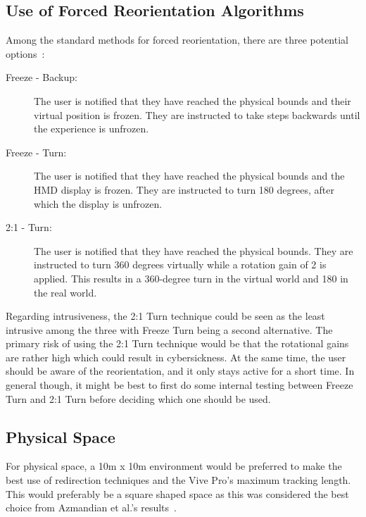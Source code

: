 \subsection{Use of Forced Reorientation Algorithms}
Among the standard methods for forced reorientation, there are three potential options~\cite{williams2007exploring}:
\begin{description}
\item[Freeze - Backup: ] The user is notified that they have reached the physical bounds and their virtual position is frozen. They are instructed to take steps backwards until the experience is unfrozen. 
\item[Freeze - Turn: ] The user is notified that they have reached the physical bounds and the HMD display is frozen. They are instructed to turn 180 degrees, after which the display is unfrozen. 
\item[2:1 - Turn: ] The user is notified that they have reached the physical bounds. They are instructed to turn 360 degrees virtually while a rotation gain of 2 is applied. This results in a 360-degree turn in the virtual world and 180 in the real world.
\end{description}

Regarding intrusiveness, the 2:1 Turn technique could be seen as the least intrusive among the three with Freeze Turn being a second alternative. The primary risk of using the 2:1 Turn technique would be that the rotational gains are rather high which could result in cybersickness. At the same time, the user should be aware of the reorientation, and it only stays active for a short time. In general though, it might be best to first do some internal testing between Freeze Turn and 2:1 Turn before deciding which one should be used.

\subsection{Physical Space}
For physical space, a 10m x 10m environment would be preferred to make the best use of redirection techniques and the Vive Pro's maximum tracking length. This would preferably be a square shaped space as this was considered the best choice from Azmandian et al.'s results~\cite{azmandian2015physical}.

